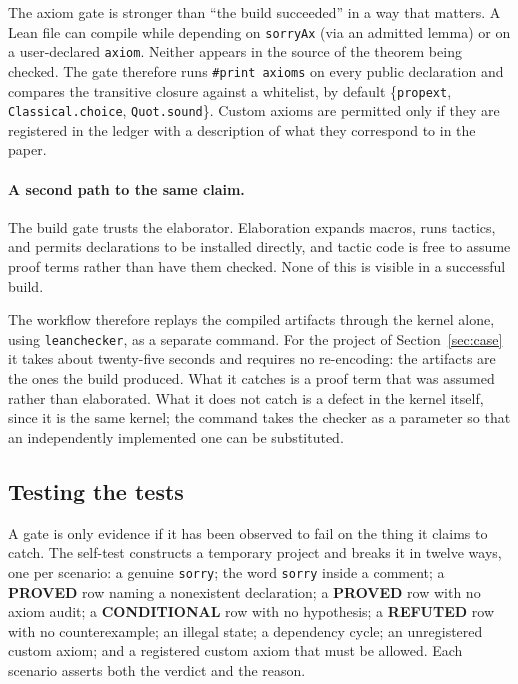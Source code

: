 \documentclass[11pt]{article}
\newcommand{\Lean}{Lean}
\newcommand{\claim}[1]{\textbf{#1}}
\newcommand{\code}[1]{\texttt{#1}}
\begin{document}
The axiom gate is stronger than ``the build succeeded'' in a way that
matters. A \Lean{} file can compile while depending on \code{sorryAx} (via an
admitted lemma) or on a user-declared \code{axiom}. Neither appears in the
source of the theorem being checked. The gate therefore runs
\code{\#print axioms} on every public declaration and compares the transitive
closure against a whitelist, by default \{\code{propext},
\code{Classical.choice}, \code{Quot.sound}\}. Custom axioms are permitted
only if they are registered in the ledger with a description of what they
correspond to in the paper.

\paragraph{A second path to the same claim.} The build gate trusts the
elaborator. Elaboration expands macros, runs tactics, and permits declarations
to be installed directly, and tactic code is free to assume proof terms rather
than have them checked. None of this is visible in a successful build.

The workflow therefore replays the compiled artifacts through the kernel alone,
using \code{leanchecker}, as a separate command. For the project of
Section~\ref{sec:case} it takes about twenty-five seconds and requires no
re-encoding: the artifacts are the ones the build produced. What it catches is
a proof term that was assumed rather than elaborated. What it does not catch
is a defect in the kernel itself, since it is the same kernel; the command
takes the checker as a parameter so that an independently implemented one can
be substituted.

\subsection{Testing the tests}

A gate is only evidence if it has been observed to fail on the thing it
claims to catch. The self-test constructs a temporary project and breaks it in
twelve ways, one per scenario: a genuine \code{sorry}; the word
\code{sorry} inside a comment; a \claim{PROVED} row naming a
nonexistent declaration; a \claim{PROVED} row with no axiom audit; a
\claim{CONDITIONAL} row with no hypothesis; a \claim{REFUTED} row with no
counterexample; an illegal state; a dependency cycle; an unregistered custom
axiom; and a registered custom axiom that must be allowed. Each scenario
asserts both the verdict and the reason.
\end{document}
